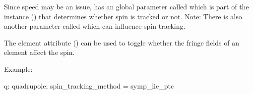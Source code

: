 Since speed may be an issue, \bmad has an global parameter called  which is
part of the  instance () that determines whether spin is tracked or
not. Note: There is also another  parameter called 
which can influence spin tracking.

The  element attribute () can be used to toggle whether the
fringe fields of an element affect the spin.

Example:
\begin{example}
  q: quadrupole, spin_tracking_method = symp_lie_ptc
\end{example}


